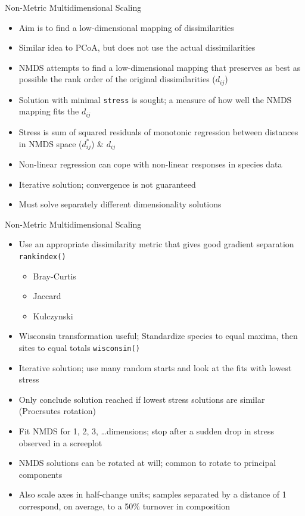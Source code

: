 \documentclass[10pt,ignorenonframetext,compress, aspectratio=169]{beamer}
\providecommand{\tightlist}{%
  \setlength{\itemsep}{0pt}\setlength{\parskip}{0pt}}
\begin{document}
\begin{frame}{Non-Metric Multidimensional Scaling}

\begin{itemize}
\tightlist
\item
  Aim is to find a low-dimensional mapping of dissimilarities
\item
  Similar idea to PCoA, but does not use the actual dissimilarities
\item
  NMDS attempts to find a low-dimensional mapping that preserves as best
  as possible the \alert{rank order} of the original dissimilarities
  (\(d_{ij}\))
\item
  Solution with minimal \texttt{stress} is sought; a measure of how well
  the NMDS mapping fits the \(d_{ij}\)
\item
  Stress is sum of squared residuals of monotonic regression between
  distances in NMDS space (\(d^*_{ij}\)) \& \(d_{ij}\)
\item
  Non-linear regression can cope with non-linear responses in species
  data
\item
  Iterative solution; convergence is not guaranteed
\item
  Must solve separately different dimensionality solutions
\end{itemize}

\end{frame}

\begin{frame}{Non-Metric Multidimensional Scaling}

\begin{itemize}
\tightlist
\item
  Use an appropriate dissimilarity metric that gives good gradient
  separation \alert{\texttt{rankindex()}}

  \begin{itemize}
  \tightlist
  \item
    Bray-Curtis
  \item
    Jaccard
  \item
    Kulczynski
  \end{itemize}
\item
  Wisconsin transformation useful; Standardize species to equal maxima,
  then sites to equal totals \alert{\texttt{wisconsin()}}
\item
  Iterative solution; use many random starts and look at the fits with
  lowest stress
\item
  Only conclude solution reached if lowest stress solutions are similar
  (Procrsutes rotation)
\item
  Fit NMDS for 1, 2, 3, \ldots dimensions; stop after a sudden drop in
  stress observed in a screeplot
\item
  NMDS solutions can be rotated at will; common to rotate to principal
  components
\item
  Also scale axes in half-change units; samples separated by a distance
  of 1 correspond, on average, to a 50\% turnover in composition
\end{itemize}

\end{frame}
\end{document}
